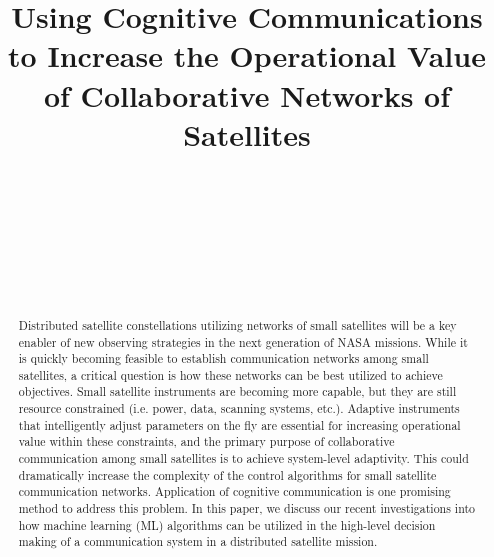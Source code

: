 \documentclass[conference]{IEEEtran}
\title{Using Cognitive Communications to Increase the Operational Value of
  Collaborative Networks of Satellites}
\author{
  \IEEEauthorblockN{Ryan B. Linnabary}
  \IEEEauthorblockA{\thisplace linnabary.24@osu.edu}
  \and
  \IEEEauthorblockN{Andrew J. O'Brien}
  \IEEEauthorblockA{\thisplace obrien.200@osu.edu}
  \and
  \IEEEauthorblockN{Graeme E. Smith}
  \IEEEauthorblockA{\thisplace smith.8347@osu.edu}
  \and
  \IEEEauthorblockN{Christopher Ball}
  \IEEEauthorblockA{\thisplace ball.51@osu.edu}
  \and {~} \and {~~~~~~~~~~~~~~~~~~~~~~~~~~~} \and
  \IEEEauthorblockN{Joel T. Johnson}
  \IEEEauthorblockA{\thisplace johnson.1374@osu.edu}
  \and {~~~~~~~~~~~~~~~~~~~~~~~} \and {~~~~~~~~~~~~~~~~~~~~~~}
}
\begin{document}
\maketitle



\begin{abstract}

  Distributed satellite constellations utilizing networks of small satellites
will be a key enabler of new observing strategies in the next generation of NASA
missions.  While it is quickly becoming feasible to establish communication
networks among small satellites, a critical question is how these networks can
be best utilized to achieve objectives.  Small satellite instruments are
becoming more capable, but they are still resource constrained (i.e. power,
data, scanning systems, etc.).  Adaptive instruments that intelligently adjust
parameters {\color{black} on the fly} are essential for increasing operational
value within these constraints, and the primary purpose of collaborative
communication among small satellites is to achieve system-level adaptivity.
This could dramatically increase the complexity of the control algorithms for
small satellite communication networks.  Application of cognitive communication
is one promising method to address this problem.  In this paper, we discuss our
recent investigations into how machine learning (ML) algorithms can be utilized
in the high-level decision making of a communication system in a distributed
satellite mission.

\end{abstract}
\end{document}
